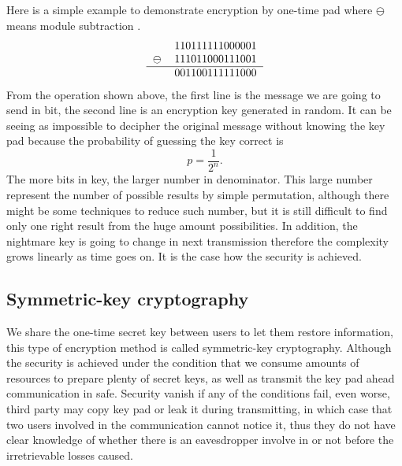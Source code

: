 \documentclass[12pt]{article}
\begin{document}
Here is a simple example to demonstrate encryption by one-time pad where $\ominus$ means module subtraction \cite[p.244]{fox2006quantum}.  
\begin{align*}
\begin{tabular}{rc} 
 & 110111111000001 \\ 
$\ominus$ & 111011000111001 \\ 
\hline 
 & 001100111111000
\end{tabular}
\end{align*}
From the operation shown above, the first line is the message we are going to send in bit, the second line is an encryption key generated in random. It can be seeing as impossible to decipher the original message without knowing the key pad because the probability of guessing the key correct is
\[
	p = \frac{1}{2^n}.
\]
The more bits in key, the larger number in denominator. This large number represent the number of possible results by simple permutation, although there might be some techniques to reduce such number, but it is still difficult to find only one right result from the huge amount possibilities. In addition, the nightmare key is going to change in next transmission therefore the complexity grows linearly as time goes on. It is the case how the security is achieved.
\subsection{Symmetric-key cryptography}
We share the one-time secret key between users to let them restore information, this type of encryption method is called symmetric-key cryptography. Although the security is achieved under the condition that we consume amounts of resources to prepare plenty of secret keys, as well as transmit the key pad ahead communication in safe. Security vanish if any of the conditions fail, even worse, third party may copy key pad or leak it during transmitting, in which case that two users involved in the communication cannot notice it, thus they do not have clear knowledge of whether there is an eavesdropper involve in or not before the irretrievable losses caused. 
\end{document}
